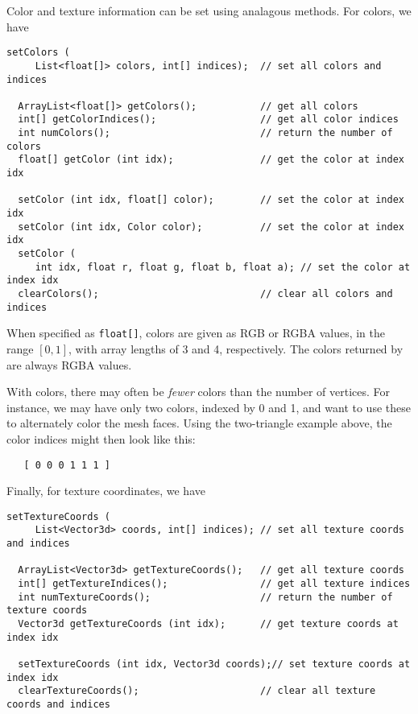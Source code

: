 Color and texture information can be set using analagous methods.
For colors, we have
%
\begin{lstlisting}[]
  setColors (
     List<float[]> colors, int[] indices);  // set all colors and indices

  ArrayList<float[]> getColors();           // get all colors
  int[] getColorIndices();                  // get all color indices
  int numColors();                          // return the number of colors
  float[] getColor (int idx);               // get the color at index idx

  setColor (int idx, float[] color);        // set the color at index idx
  setColor (int idx, Color color);          // set the color at index idx
  setColor (
     int idx, float r, float g, float b, float a); // set the color at index idx
  clearColors();                            // clear all colors and indices
\end{lstlisting}
%
When specified as {\tt float[]}, colors are given as RGB or
RGBA values, in the range $[0,1]$, with array lengths of 3 and 4,
respectively.  The colors returned by
 are always RGBA
values.

%
With colors, there may often be {\it fewer} colors than the number of
vertices. For instance, we may have only two colors, indexed by 0 and
1, and want to use these to alternately color the mesh faces. Using
the two-triangle example above, the color indices might then look like
this:
%
\begin{verbatim}
   [ 0 0 0 1 1 1 ]
\end{verbatim}
%

Finally, for texture coordinates, we have
%
\begin{lstlisting}[]
  setTextureCoords (
     List<Vector3d> coords, int[] indices); // set all texture coords and indices

  ArrayList<Vector3d> getTextureCoords();   // get all texture coords
  int[] getTextureIndices();                // get all texture indices
  int numTextureCoords();                   // return the number of texture coords
  Vector3d getTextureCoords (int idx);      // get texture coords at index idx

  setTextureCoords (int idx, Vector3d coords);// set texture coords at index idx
  clearTextureCoords();                     // clear all texture coords and indices
\end{lstlisting}

